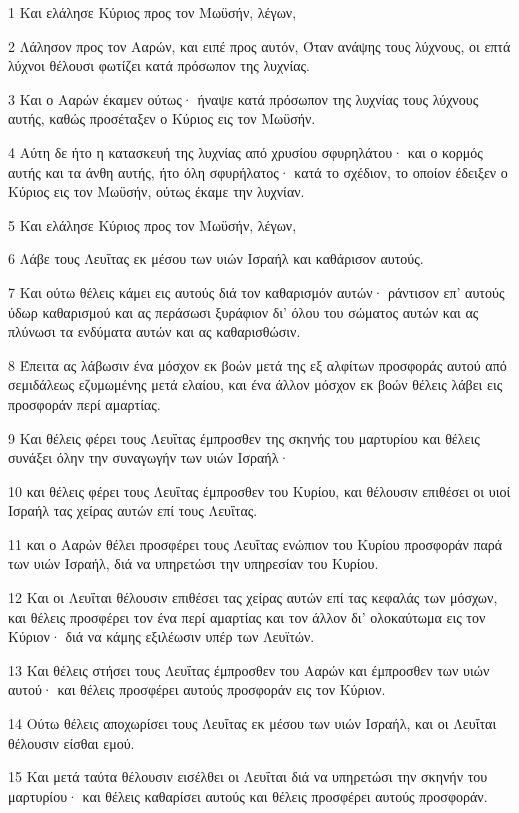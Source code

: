 \par 1 Και ελάλησε Κύριος προς τον Μωϋσήν, λέγων,
\par 2 Λάλησον προς τον Ααρών, και ειπέ προς αυτόν, Όταν ανάψης τους λύχνους, οι επτά λύχνοι θέλουσι φωτίζει κατά πρόσωπον της λυχνίας.
\par 3 Και ο Ααρών έκαμεν ούτως· ήναψε κατά πρόσωπον της λυχνίας τους λύχνους αυτής, καθώς προσέταξεν ο Κύριος εις τον Μωϋσήν.
\par 4 Αύτη δε ήτο η κατασκευή της λυχνίας από χρυσίου σφυρηλάτου· και ο κορμός αυτής και τα άνθη αυτής, ήτο όλη σφυρήλατος· κατά το σχέδιον, το οποίον έδειξεν ο Κύριος εις τον Μωϋσήν, ούτως έκαμε την λυχνίαν.
\par 5 Και ελάλησε Κύριος προς τον Μωϋσήν, λέγων,
\par 6 Λάβε τους Λευΐτας εκ μέσου των υιών Ισραήλ και καθάρισον αυτούς.
\par 7 Και ούτω θέλεις κάμει εις αυτούς διά τον καθαρισμόν αυτών· ράντισον επ' αυτούς ύδωρ καθαρισμού και ας περάσωσι ξυράφιον δι' όλου του σώματος αυτών και ας πλύνωσι τα ενδύματα αυτών και ας καθαρισθώσιν.
\par 8 Έπειτα ας λάβωσιν ένα μόσχον εκ βοών μετά της εξ αλφίτων προσφοράς αυτού από σεμιδάλεως εζυμωμένης μετά ελαίου, και ένα άλλον μόσχον εκ βοών θέλεις λάβει εις προσφοράν περί αμαρτίας.
\par 9 Και θέλεις φέρει τους Λευΐτας έμπροσθεν της σκηνής του μαρτυρίου και θέλεις συνάξει όλην την συναγωγήν των υιών Ισραήλ·
\par 10 και θέλεις φέρει τους Λευΐτας έμπροσθεν του Κυρίου, και θέλουσιν επιθέσει οι υιοί Ισραήλ τας χείρας αυτών επί τους Λευΐτας.
\par 11 και ο Ααρών θέλει προσφέρει τους Λευΐτας ενώπιον του Κυρίου προσφοράν παρά των υιών Ισραήλ, διά να υπηρετώσι την υπηρεσίαν του Κυρίου.
\par 12 Και οι Λευΐται θέλουσιν επιθέσει τας χείρας αυτών επί τας κεφαλάς των μόσχων, και θέλεις προσφέρει τον ένα περί αμαρτίας και τον άλλον δι' ολοκαύτωμα εις τον Κύριον· διά να κάμης εξιλέωσιν υπέρ των Λευϊτών.
\par 13 Και θέλεις στήσει τους Λευΐτας έμπροσθεν του Ααρών και έμπροσθεν των υιών αυτού· και θέλεις προσφέρει αυτούς προσφοράν εις τον Κύριον.
\par 14 Ούτω θέλεις αποχωρίσει τους Λευΐτας εκ μέσου των υιών Ισραήλ, και οι Λευΐται θέλουσιν είσθαι εμού.
\par 15 Και μετά ταύτα θέλουσιν εισέλθει οι Λευΐται διά να υπηρετώσι την σκηνήν του μαρτυρίου· και θέλεις καθαρίσει αυτούς και θέλεις προσφέρει αυτούς προσφοράν.
